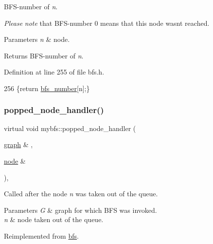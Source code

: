 B\+F\+S-\/number of {\itshape n}. 

{\itshape Please} {\itshape note} that B\+F\+S-\/number 0 means that this node wasn\textquotesingle{}t reached.


\begin{DoxyParams}{Parameters}
{\em n} & node. \\
\hline
\end{DoxyParams}
\begin{DoxyReturn}{Returns}
B\+F\+S-\/number of {\itshape n}. 
\end{DoxyReturn}


Definition at line 255 of file bfs.\+h.


\begin{DoxyCode}
256     \{\textcolor{keywordflow}{return} \mbox{\hyperlink{classbfs_a59d0c5c5ad2715776b20b1aec03dbc3a}{bfs\_number}}[n];\}
\end{DoxyCode}
\mbox{\label{classmybfs_a9d6e9e39f16d92ce1bcf368fe92b6856}} 
\subsubsection{\texorpdfstring{popped\+\_\+node\+\_\+handler()}{popped\_node\_handler()}}
{\footnotesize\ttfamily virtual void mybfs\+::popped\+\_\+node\+\_\+handler (\begin{DoxyParamCaption}\item[{\mbox{\hyperlink{classgraph}{graph}} \&}]{,  }\item[{\mbox{\hyperlink{classnode}{node}} \&}]{ }\end{DoxyParamCaption})\hspace{0.3cm}{\ttfamily [inline]}, {\ttfamily [virtual]}}



Called after the node {\itshape n} was taken out of the queue. 


\begin{DoxyParams}{Parameters}
{\em G} & graph for which B\+FS was invoked. \\
\hline
{\em n} & node taken out of the queue. \\
\hline
\end{DoxyParams}


Reimplemented from \mbox{\hyperlink{classbfs_a09c7e35a4c20a24f1a54d63a0a9319a5}{bfs}}.



